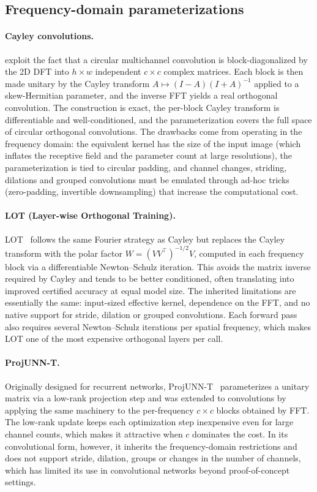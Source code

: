     \subsection{Frequency-domain parameterizations}

        \paragraph{Cayley convolutions.}
        \cite{trockman_orthogonalizing_2021} exploit the fact that a circular multichannel convolution is block-diagonalized by the 2D DFT into $h \times w$ independent $c \times c$ complex matrices. Each block is then made unitary by the Cayley transform $A \mapsto (I - A)(I + A)^{-1}$ applied to a skew-Hermitian parameter, and the inverse FFT yields a real orthogonal convolution. The construction is exact, the per-block Cayley transform is differentiable and well-conditioned, and the parameterization covers the full space of circular orthogonal convolutions. The drawbacks come from operating in the frequency domain: the equivalent kernel has the size of the input image (which inflates the receptive field and the parameter count at large resolutions), the parameterization is tied to circular padding, and channel changes, striding, dilations and grouped convolutions must be emulated through ad-hoc tricks (zero-padding, invertible downsampling) that increase the computational cost.

        \paragraph{LOT (Layer-wise Orthogonal Training).}
        LOT~\cite{xu_lot_2023} follows the same Fourier strategy as Cayley but replaces the Cayley transform with the polar factor $W = (VV^\top)^{-1/2}V$, computed in each frequency block via a differentiable Newton--Schulz iteration. This avoids the matrix inverse required by Cayley and tends to be better conditioned, often translating into improved certified accuracy at equal model size. The inherited limitations are essentially the same: input-sized effective kernel, dependence on the FFT, and no native support for stride, dilation or grouped convolutions. Each forward pass also requires several Newton--Schulz iterations per spatial frequency, which makes LOT one of the most expensive orthogonal layers per call.

        \paragraph{ProjUNN-T.}
        Originally designed for recurrent networks, ProjUNN-T~\cite{kiani_projunn_2022} parameterizes a unitary matrix via a low-rank projection step and was extended to convolutions by applying the same machinery to the per-frequency $c \times c$ blocks obtained by FFT. The low-rank update keeps each optimization step inexpensive even for large channel counts, which makes it attractive when $c$ dominates the cost. In its convolutional form, however, it inherits the frequency-domain restrictions and does not support stride, dilation, groups or changes in the number of channels, which has limited its use in convolutional networks beyond proof-of-concept settings.

